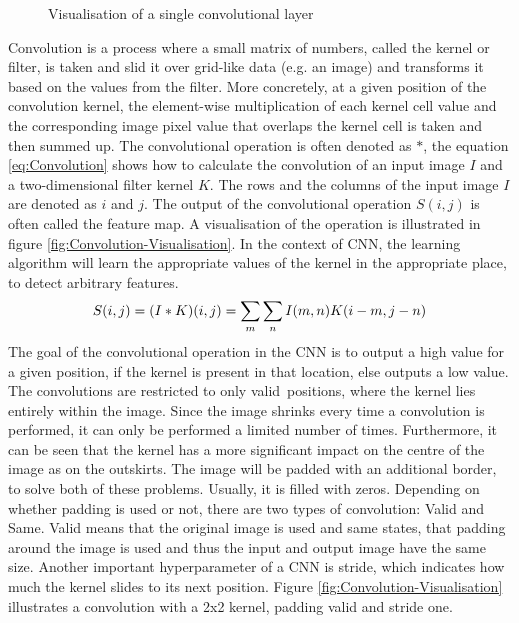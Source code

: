 \begin{figure}[htbp]
    \captionsetup{format=plain}
    \centering
    \caption{Visualisation of a single convolutional layer}
    \label{fig:Convolution-Layer-Visualisation}
\end{figure}
\noindent
Convolution is a process where a small matrix of numbers, called the kernel or filter, is taken and slid it over grid-like data (e.g. an image) and transforms it based on the values from the filter. More concretely, at a given position of the convolution kernel, the element-wise multiplication of each kernel cell value and the corresponding image pixel value that overlaps the kernel cell is taken and then summed up. The convolutional operation is often denoted as $\ast$, the equation \ref{eq:Convolution} shows how to calculate the convolution of an input image $I$ and a two-dimensional filter kernel $K$. The rows and the columns of the input image $I$ are denoted as $i$ and $j$. The output of the convolutional operation $S(i,j)$ is often called the feature map. A visualisation of the operation is illustrated in figure \ref{fig:Convolution-Visualisation}. In the context of \gls{CNN}, the learning algorithm will learn the appropriate values of the kernel in the appropriate place, to detect arbitrary features.
\begin{equation}
    \centering
    S(i,j) = (I \ast K)(i,j) = \sum_m \sum_n I(m,n)K(i-m, j-n)
    \label{eq:Convolution}
\end{equation}
The goal of the convolutional operation in the \gls{CNN} is to output a high value for a given position, if the kernel is present in that location, else outputs a low value. The convolutions are restricted to only \flqq valid\frqq \ positions, where the kernel lies entirely within the image. Since the image shrinks every time a convolution is performed, it can only be performed a limited number of times. Furthermore, it can be seen that the kernel has a more significant impact on the centre of the image as on the outskirts. The image will be padded with an additional border, to solve both of these problems. Usually, it is filled with zeros. Depending on whether padding is used or not, there are two types of convolution: Valid and Same. Valid means that the original image is used and same states, that padding around the image is used and thus the input and output image have the same size. Another important hyperparameter of a \gls{CNN} is stride, which indicates how much the kernel slides to its next position. Figure \ref{fig:Convolution-Visualisation} illustrates a convolution with a 2x2 kernel, padding valid and stride one. 

